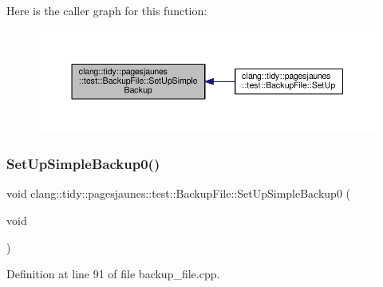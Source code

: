 Here is the caller graph for this function\+:
\nopagebreak
\begin{figure}[H]
\begin{center}
\leavevmode
\includegraphics[width=350pt]{classclang_1_1tidy_1_1pagesjaunes_1_1test_1_1_backup_file_aff6562634de2e56533cb1220894c9b90_icgraph}
\end{center}
\end{figure}
\mbox{\label{classclang_1_1tidy_1_1pagesjaunes_1_1test_1_1_backup_file_a1c3f8ddd2e12ac89a6a2b43bc269f69c}} 
\subsubsection{\texorpdfstring{Set\+Up\+Simple\+Backup0()}{SetUpSimpleBackup0()}}
{\footnotesize\ttfamily void clang\+::tidy\+::pagesjaunes\+::test\+::\+Backup\+File\+::\+Set\+Up\+Simple\+Backup0 (\begin{DoxyParamCaption}\item[{void}]{ }\end{DoxyParamCaption})\hspace{0.3cm}{\ttfamily [virtual]}}



Definition at line 91 of file backup\+\_\+file.\+cpp.


